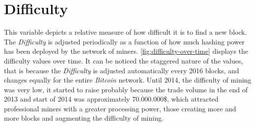 


\section{Difficulty}
\label{sec:difficulty}


This variable depicts a relative measure of how difficult it is to
find a new block. The \textit{Difficulty} is adjusted periodically as
a function of how much hashing power has been deployed by the network
of miners. \autoref{fig:difficulty-over-time} displays the difficulty
values over time. It can be noticed the staggered nature of the
values, that is because the \textit{Difficulty} is adjusted
automatically every 2016 blocks, and changes equally for the entire
\textit{Bitcoin} network. Until 2014, the difficulty of mining was
very low, it started to raise probably because the trade volume in the
end of 2013 and start of 2014 was approximately 70.000.000\$, which
attracted professional miners with a greater processing power, those
creating more and more blocks and augmenting the difficulty of mining.

